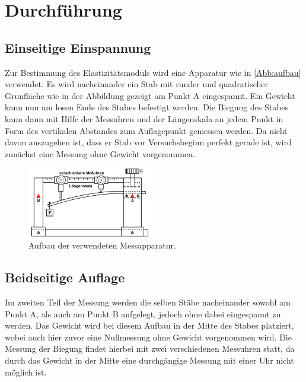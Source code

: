 \section{Durchführung}
\label{sec:Durchführung}

\subsection{Einseitige Einspannung}

Zur Bestimmung des Elastizitätsmoduls wird eine Apparatur wie in \autoref{Abb:aufbau} verwendet. Es wird nacheinander ein Stab mit runder und quadratischer Grunfläche
wie in der Abbildung gezeigt am Punkt A eingespannt. Ein Gewicht kann nun am losen Ende des Stabes befestigt werden. Die Biegung des Stabes kann dann mit Hilfe der Messuhren
und der Längenskala an jedem Punkt in Form des vertikalen Abstandes zum Auflagepunkt gemessen werden. Da nicht davon auszugehen ist, dass er Stab vor Versuchsbeginn perfekt
gerade ist, wird zunächst eine Messung ohne Gewicht vorgenommen.
\begin{figure}
    \centering
    \includegraphics[width=5.5cm]{Dateien/v103Abbildung.jpg}
    \caption{Aufbau der verwendeten Messapparatur.}
    \label{Abb:aufbau}
\end{figure}


\subsection{Beidseitige Auflage}
Im zweiten Teil der Messung werden die selben Stäbe nacheinander sowohl am Punkt A, als auch am Punkt B aufgelegt, jedoch ohne dabei eingespannt zu werden. Das Gewicht wird bei
diesem Aufbau in der Mitte des Stabes platziert, wobei auch hier zuvor eine Nullmessung ohne Gewicht vorgenommen wird. Die Messung der Biegung findet hierbei mit zwei verschiedenen Messuhren
statt, da durch das Gewicht in der Mitte eine durchgängige Messung mit einer Uhr nicht möglich ist.